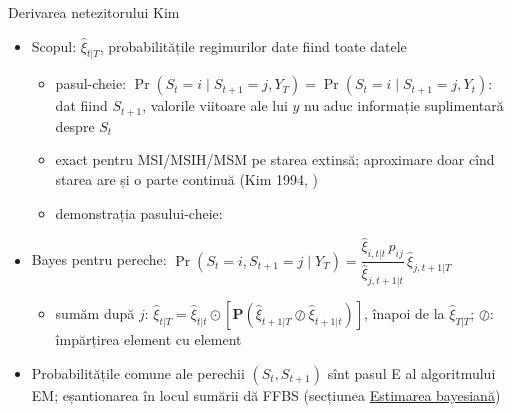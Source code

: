 \begin{frame}{Derivarea netezitorului Kim}
\itemsize{\small}
\begin{itemize}
    \item Scopul: $\hat\xi_{t|T}$, probabilitățile regimurilor date fiind toate datele 
    \begin{itemize}
        \item pasul-cheie: $\Pr(S_t = i \mid S_{t+1} = j, Y_T) = \Pr(S_t = i \mid S_{t+1} = j, Y_t)$: dat fiind $S_{t+1}$, valorile viitoare ale lui $y$ nu aduc informație suplimentară despre $S_t$
        \item exact pentru MSI/MSIH/MSM pe starea extinsă; aproximare doar cînd starea are și o parte continuă (Kim 1994, )
        \item demonstrația pasului-cheie:   %
    \end{itemize}
    \item Bayes pentru pereche: $\Pr(S_t = i, S_{t+1} = j \mid Y_T) = \dfrac{\hat\xi_{i,t|t}\,p_{ij}}{\hat\xi_{j,t+1|t}}\,\hat\xi_{j,t+1|T}$
    \begin{itemize}
        \item sumăm după $j$: $\hat\xi_{t|T} = \hat\xi_{t|t}\odot\left[\mathbf{P}(\hat\xi_{t+1|T}\oslash\hat\xi_{t+1|t})\right]$, înapoi de la $\hat\xi_{T|T}$; $\oslash$: împărțirea element cu element
    \end{itemize}
    \item Probabilitățile comune ale perechii $(S_t, S_{t+1})$ sînt pasul E al algoritmului EM; eșantionarea în locul sumării dă FFBS (secțiunea \hyperlink{ch7bayes}{\textcolor{MainBlue}{Estimarea bayesiană}})
\end{itemize}
\end{frame}

